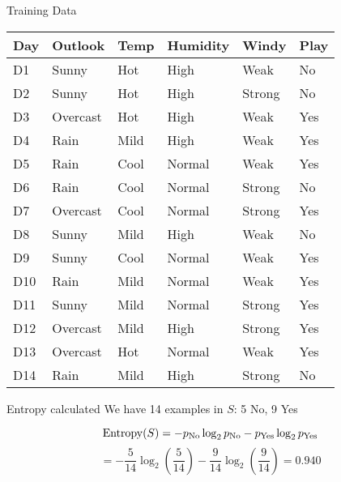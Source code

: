 \documentclass[dvipsnames]{beamer}
\begin{document}
	\begin{frame}{Training Data}
\begin{tabular}{lllll||l} \toprule
	\textbf{Day} & \textbf{Outlook}  & \textbf{Temp} & \textbf{Humidity} & \textbf{Windy}  & \textbf{Play} \\ \midrule
	D1  & Sunny    & Hot  & High     & Weak   & No   \\
	D2  & Sunny    & Hot  & High     & Strong & No   \\
	D3  & Overcast & Hot  & High     & Weak   & Yes  \\
	D4  & Rain     & Mild & High     & Weak   & Yes  \\
	D5  & Rain     & Cool & Normal   & Weak   & Yes  \\
	D6  & Rain     & Cool & Normal   & Strong & No   \\
	D7  & Overcast & Cool & Normal   & Strong & Yes  \\
	D8  & Sunny    & Mild & High     & Weak   & No   \\
	D9  & Sunny    & Cool & Normal   & Weak   & Yes  \\
	D10 & Rain     & Mild & Normal   & Weak   & Yes  \\
	D11 & Sunny    & Mild & Normal   & Strong & Yes  \\
	D12 & Overcast & Mild & High     & Strong & Yes  \\
	D13 & Overcast & Hot  & Normal   & Weak   & Yes  \\
	D14 & Rain     & Mild & High     & Strong & No  \\ \bottomrule
\end{tabular}
\end{frame}


\begin{frame}{Entropy calculated}
We have 14 examples in $S$: 5 No, 9 Yes

$$\operatorname{Entropy}(S) = -p_{\text{No}} \log_2 p_{\text{No}} - p_{\text{Yes}} \log_2 p_{\text{Yes}}$$
$$
= -\frac{5}{14} \log_2\left(\frac{5}{14}\right) - \frac{9}{14} \log_2\left(\frac{9}{14}\right) = 0.940
$$
\end{frame}
\end{document}
